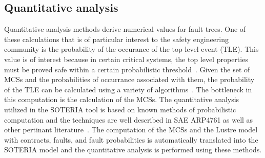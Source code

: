  



\subsection{Quantitative analysis}
Quantitative analysis methods derive numerical values for fault trees. One of these calculations that is of particular interest to the safety engineering community is the probability of the occurance of the top level event (TLE). This value is of interest because in certain critical systems, the top level properties must be proved safe within a certain probabilistic threshold~\cite{SAE:ARP4761}. Given the set of MCSs and the probabilities of occurrance associated with them, the probability of the TLE can be calculated using a variety of algorithms~\cite{RuijtersSurvey}. The bottleneck in this computation is the calculation of the MCSs. The quantitative analysis utilized in the SOTERIA tool is based on known methods of probabilistic computation and the techniques are well described in SAE ARP4761 as well as other pertinant literature~\cite{RuijtersSurvey, SOTERIAproject,SAE:ARP4761}. The computation of the MCSs and the Lustre model with contracts, faults, and fault probabilities is automatically translated into the SOTERIA model and the quantitative analysis is performed using these methods. 






